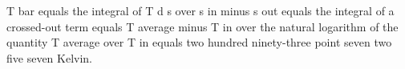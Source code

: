 T bar equals the integral of T d s over s in minus s out equals the integral of a crossed-out term equals T average minus T in over the natural logarithm of the quantity T average over T in equals two hundred ninety-three point seven two five seven Kelvin.